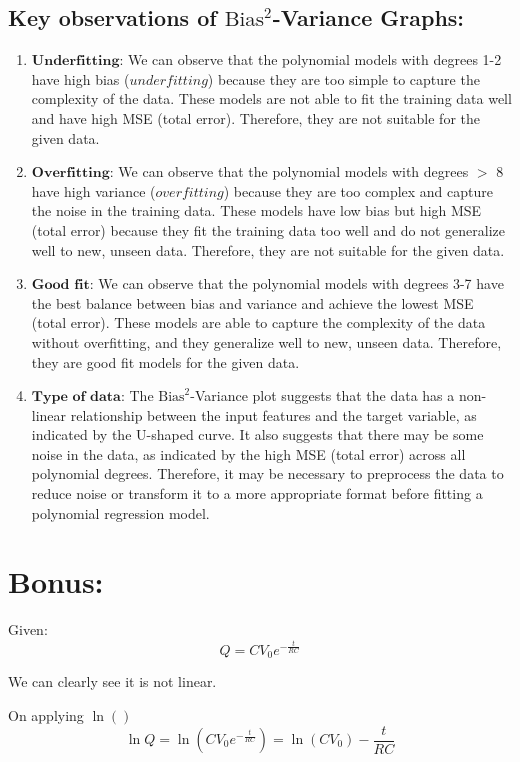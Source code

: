 \documentclass{article}
\begin{document}
\subsection*{Key observations of $\mbox{Bias}^2$-Variance Graphs:}
\begin{enumerate}
    \item $\textbf{Underfitting}$: We can observe that the polynomial models with degrees 1-2 have high bias ($underfitting$) because they are too simple to capture the complexity of the data. These models are not able to fit the training data well and have high MSE (total error). Therefore, they are not suitable for the given data.

    \item $\textbf{Overfitting}$: We can observe that the polynomial models with degrees $>$ 8 have high variance ($overfitting$) because they are too complex and capture the noise in the training data. These models have low bias but high MSE (total error) because they fit the training data too well and do not generalize well to new, unseen data. Therefore, they are not suitable for the given data.
    
    \item $\textbf{Good fit}$: We can observe that the polynomial models with degrees 3-7 have the best balance between bias and variance and achieve the lowest MSE (total error). These models are able to capture the complexity of the data without overfitting, and they generalize well to new, unseen data. Therefore, they are good fit models for the given data.
    
    \item $\textbf{Type of data}$: The $\mbox{Bias}^2$-Variance plot suggests that the data has a non-linear relationship between the input features and the target variable, as indicated by the U-shaped curve. It also suggests that there may be some noise in the data, as indicated by the high MSE (total error) across all polynomial degrees. Therefore, it may be necessary to preprocess the data to reduce noise or transform it to a more appropriate format before fitting a polynomial regression model.
\end{enumerate}
\section{Bonus:}
Given: \[Q=CV_0e^{-\frac{t}{RC}}\]

We can clearly see it is not linear.

On applying $\ln()$
\[\ln Q = \ln(CV_0e^{-\frac{t}{RC}}) = \ln(CV_0) - \frac{t}{RC}\]
\end{document}
